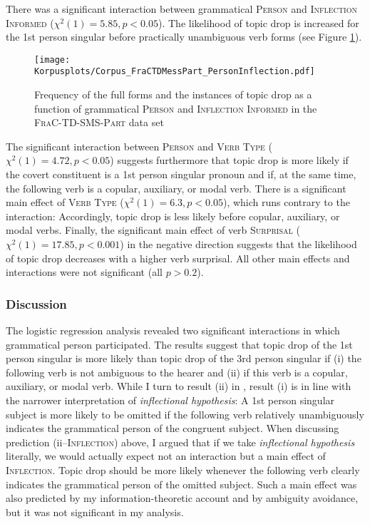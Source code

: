 There was a significant interaction between grammatical \textsc{Person} and \textsc{Inflection Informed} ($\chi^2(1) = 5.85, p < 0.05$).
The likelihood of topic drop is increased for the 1st person singular before practically unambiguous verb forms (see Figure \ref{fig:frac.corpus.plot.freq.person}).

\begin{figure}
\centering
\texttt{[image: Korpusplots/Corpus\_FraCTDMessPart\_PersonInflection.pdf]}
\caption{Frequency of the full forms and the instances of topic drop as a function of grammatical \textsc{Person} and \textsc{Inflection Informed} in the \textsc{FraC-TD-SMS-Part} data set}
\label{fig:frac.corpus.plot.freq.person}
\end{figure}

The significant interaction between \textsc{Person} and \textsc{Verb Type} ($\chi^2(1) = 4.72, p < 0.05$) suggests furthermore that topic drop is more likely if the covert constituent is a 1st person singular pronoun and if, at the same time, the following verb is a copular, auxiliary, or modal verb.
There is a significant main effect of \textsc{Verb Type} ($\chi^2(1) = 6.3, p < 0.05$), which runs contrary to the interaction:
Accordingly, topic drop is less likely before copular, auxiliary, or modal verbs.
Finally, the significant main effect of verb \textsc{Surprisal} ($\chi^2(1) = 17.85, p < 0.001$) in the negative direction suggests that the likelihood of topic drop decreases with a higher verb surprisal.
All other main effects and interactions were not significant (all $p > 0.2$).

\subsubsection{Discussion}\label{sec:corpus.inference.diss}
The logistic regression analysis revealed two significant interactions in which grammatical person participated.
The results suggest that topic drop of the 1st person singular is more likely than topic drop of the 3rd person singular if (i) the following verb is not ambiguous  to the hearer and (ii) if this verb is a copular, auxiliary, or modal verb.
While I turn to result (ii) in , result (i) is in line with the narrower interpretation of  \textit{inflectional hypothesis}:
A 1st person singular subject is more likely to be omitted if the following verb relatively unambiguously indicates the grammatical person of the congruent subject.
When discussing prediction (ii--\textsc{Inflection}) above, I argued that if we take  \textit{inflectional hypothesis} literally, we would actually expect not an interaction but a main effect of \textsc{Inflection}.
Topic drop should be more likely whenever the following verb clearly indicates the grammatical person of the omitted subject.
Such a main effect was also predicted by my information-theoretic account and by ambiguity avoidance, but it was not significant in my analysis.

